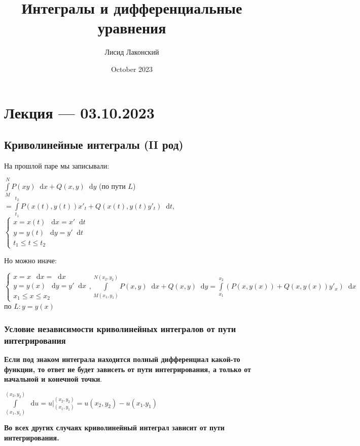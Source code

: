 \documentclass{article}
\title{Интегралы и дифференциальные уравнения}
\author{Лисид Лаконский}
\date{October 2023}
\newcommand*\diff{\mathop{}\!\mathrm{d}}
\begin{document}
\raggedright

\maketitle

\tableofcontents
\pagebreak

\section{Лекция — 03.10.2023}

\subsection{Криволинейные интегралы (II род)}

На прошлой паре мы записывали:

$\int\limits_{M}^{N} P(x y) \diff x + Q(x, y) \diff y$ (по пути $L$) $= \int\limits_{t_1}^{t_2} P(x(t), y(t)) x'_t + Q(x(t), y(t) y'_t) \diff t$, $\begin{cases}
    x = x(t) \ \diff x = x' \diff t \\
    y = y(t) \ \diff y = y' \diff t \\
    t_1 \le t \le t_2
\end{cases}$

Но можно иначе:

$\begin{cases}
    x = x \ \diff x = \diff x \\
    y = y(x) \ \diff y = y' \diff x \\
    x_1 \le x \le x_2
\end{cases}, \int\limits_{M(x_1, y_1)}^{N(x_2, y_2)} P(x, y) \diff x + Q(x, y) \diff y = \int\limits_{x_1}^{x_2} (P(x, y(x)) + Q(x, y(x)) y'_x) \diff x$ по $L: y = y(x)$

\subsubsection{Условие независимости криволинейных интегралов от пути интегрирования}

\textbf{Если под знаком интеграла находится полный дифференциал какой-то функции, то ответ не будет зависеть от пути интегрирования, а только от начальной и конечной точки}.

$\int\limits_{(x_1, y_1)}^{(x_2, y_2)} \diff u = u \bigg|_{(x_1, y_1)}^{(x_2, y_2)} = u(x_2, y_2) - u(x_1. y_1)$

\textbf{Во всех других случаях криволинейный интеграл зависит от пути интегрирования.}
\end{document}
